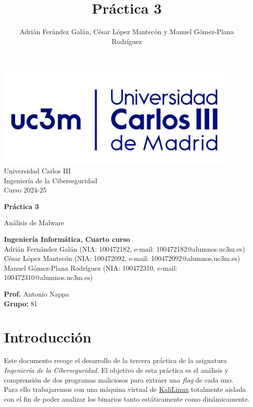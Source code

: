 \documentclass[]{article}
\title{Práctica 3}
\author{Adrián Ferández Galán, César López Mantecón y Manuel Gómez-Plana Rodríguez}
\begin{document}
\begin{titlepage}
    \centering
   \includegraphics[width=0.9\textwidth]{uc3m.jpg} 
    {\Huge Universidad Carlos III\\
    
     \Large Ingeniería de la Ciberseguridad\\
     \vspace{0.5cm}
     Curso 2024-25}
    \vspace{2cm}

    {\Huge \textbf{Práctica 3} \par}
    \vspace{0.5cm}
    {\Large Análisis de Malware\par}
    \vspace{8cm}

   \textbf{Ingeniería Informática, Cuarto curso}\\
    \vspace{0.2cm} 
    Adrián Fernández Galán       (NIA: 100472182, e-mail: 100472182@alumnos.uc3m.es)\\
    César López Mantecón         (NIA: 100472092, e-mail: 100472092@alumnos.uc3m.es)\\
    Manuel Gómez-Plana Rodríguez (NIA: 100472310, e-mail: 100472310@alumnos.uc3m.es)
    \vspace{0.5cm}

   
    \textbf{Prof.} Antonio Nappa\\
    
    \textbf{Grupo: } 81   
    
\end{titlepage}
\newpage


\newpage

\lstset{style=bash}
\section{Introducción}
\label{sec:introduccion}
Este documento recoge el desarrollo de la tercera práctica de la asignatura
\textit{Ingeniería de la Ciberseguridad}. El objetivo de esta práctica es el
análisis y comprensión de dos programas maliciosos para extraer una
\textit{flag} de cada uno. Para ello trabajaremos con una máquina virtual de
\href{https://www.kali.org/}{KaliLinux} totalmente aislada con el fin de poder
analizar los binarios tanto estáticamente como dinámicamente.
\end{document}
